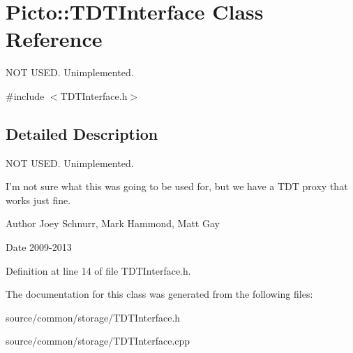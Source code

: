 \hypertarget{class_picto_1_1_t_d_t_interface}{\section{Picto\-:\-:T\-D\-T\-Interface Class Reference}
\label{class_picto_1_1_t_d_t_interface}
}


N\-O\-T U\-S\-E\-D. Unimplemented.  




{\ttfamily \#include $<$T\-D\-T\-Interface.\-h$>$}



\subsection{Detailed Description}
N\-O\-T U\-S\-E\-D. Unimplemented. 

I'm not sure what this was going to be used for, but we have a T\-D\-T proxy that works just fine. \begin{DoxyAuthor}{Author}
Joey Schnurr, Mark Hammond, Matt Gay 
\end{DoxyAuthor}
\begin{DoxyDate}{Date}
2009-\/2013 
\end{DoxyDate}


Definition at line 14 of file T\-D\-T\-Interface.\-h.



The documentation for this class was generated from the following files\-:\begin{DoxyCompactItemize}
\item 
source/common/storage/T\-D\-T\-Interface.\-h\item 
source/common/storage/T\-D\-T\-Interface.\-cpp\end{DoxyCompactItemize}
